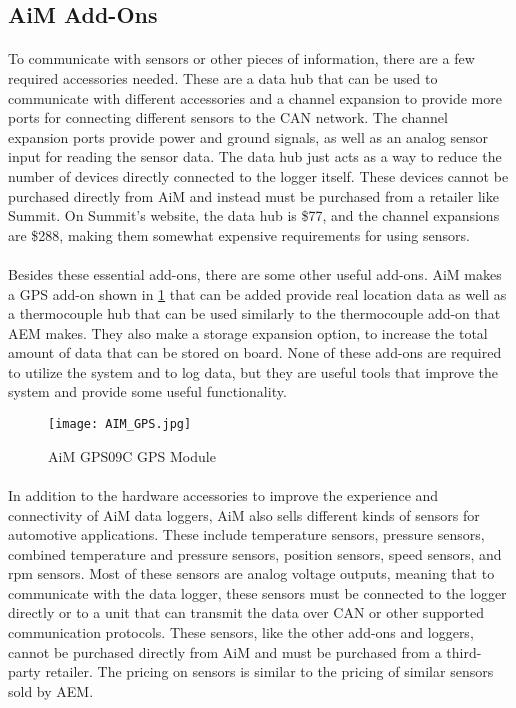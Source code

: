 \subsection{AiM Add-Ons}

\paragraph{}
To communicate with sensors or other pieces of information, there are a few required accessories needed.
These are a data hub that can be used to communicate with different accessories and a channel expansion to provide more ports for connecting different sensors to the CAN network.
The channel expansion ports provide power and ground signals, as well as an analog sensor input for reading the sensor data.
The data hub just acts as a way to reduce the number of devices directly connected to the logger itself.
These devices cannot be purchased directly from AiM and instead must be purchased from a retailer like Summit.
On Summit's website, the data hub is \$77, and the channel expansions are \$288, making them somewhat expensive requirements for using sensors.

\paragraph{}
Besides these essential add-ons, there are some other useful add-ons.
AiM makes a GPS add-on shown in \cref{fig:AIM_GPS} that can be added provide real location data as well as a thermocouple hub that can be used similarly to the thermocouple add-on that AEM makes.
They also make a storage expansion option, to increase the total amount of data that can be stored on board.
None of these add-ons are required to utilize the system and to log data, but they are useful tools that improve the system and provide some useful functionality.

\begin{figure}[H]
	\centering
	\texttt{[image: AIM\_GPS.jpg]}
	\caption{AiM GPS09C GPS Module}
	\label{fig:AIM_GPS}
\end{figure}

\paragraph{}
In addition to the hardware accessories to improve the experience and connectivity of AiM data loggers, AiM also sells different kinds of sensors for automotive applications.
These include temperature sensors, pressure sensors, combined temperature and pressure sensors, position sensors, speed sensors, and rpm sensors.
Most of these sensors are analog voltage outputs, meaning that to communicate with the data logger, these sensors must be connected to the logger directly or to a unit that can transmit the data over CAN or other supported communication protocols.
These sensors, like the other add-ons and loggers, cannot be purchased directly from AiM and must be purchased from a third-party retailer.
The pricing on sensors is similar to the pricing of similar sensors sold by AEM.

